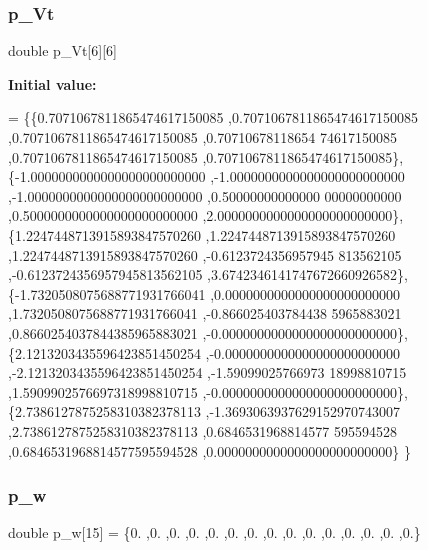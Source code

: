 \subsubsection{\texorpdfstring{p\+\_\+\+Vt}{p\_Vt}}
{\footnotesize\ttfamily double p\+\_\+\+Vt\mbox{[}6\mbox{]}\mbox{[}6\mbox{]}}

{\bfseries Initial value\+:}
\begin{DoxyCode}
= \{\{0.7071067811865474617150085 ,0.7071067811865474617150085 ,0.7071067811865474617150085 ,0.70710678118654
      74617150085 ,0.7071067811865474617150085 ,0.7071067811865474617150085\},
\{-1.0000000000000000000000000 ,-1.0000000000000000000000000 ,-1.0000000000000000000000000 ,0.50000000000000
      00000000000 ,0.5000000000000000000000000 ,2.0000000000000000000000000\},
\{1.2247448713915893847570260 ,1.2247448713915893847570260 ,1.2247448713915893847570260 ,-0.6123724356957945
      813562105 ,-0.6123724356957945813562105 ,3.6742346141747672660926582\},
\{-1.7320508075688771931766041 ,0.0000000000000000000000000 ,1.7320508075688771931766041 ,-0.866025403784438
      5965883021 ,0.8660254037844385965883021 ,-0.0000000000000000000000000\},
\{2.1213203435596423851450254 ,-0.0000000000000000000000000 ,-2.1213203435596423851450254 ,-1.59099025766973
      18998810715 ,1.5909902576697318998810715 ,-0.0000000000000000000000000\},
\{2.7386127875258310382378113 ,-1.3693063937629152970743007 ,2.7386127875258310382378113 ,0.6846531968814577
      595594528 ,0.6846531968814577595594528 ,0.0000000000000000000000000\}
\}
\end{DoxyCode}
\mbox{\label{a00449_a80f7095bf89a5db35e017cc7a99d0ef9}} 
\subsubsection{\texorpdfstring{p\+\_\+w}{p\_w}}
{\footnotesize\ttfamily double p\+\_\+w\mbox{[}15\mbox{]} = \{0. ,0. ,0. ,0. ,0. ,0. ,0. ,0. ,0. ,0. ,0. ,0. ,0. ,0. ,0.\}}

